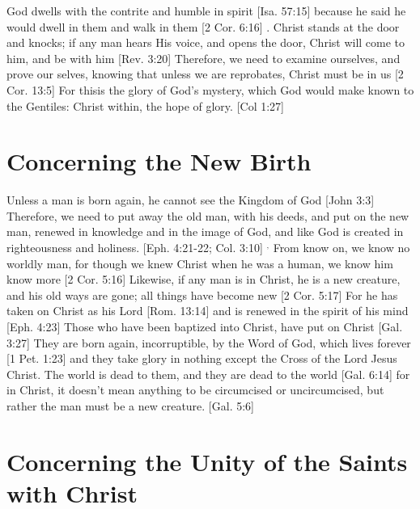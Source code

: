 \documentclass[../main.tex] {subfiles}
\begin{document}
	God dwells with the contrite and humble in spirit [Isa. 57:15]  because he said he would dwell in them and walk in them [2 Cor. 6:16] . Christ stands at the door and knocks; if any man hears His voice, and opens the door, Christ will come to him, and be with him [Rev. 3:20]  Therefore, we need to examine ourselves, and prove our selves, knowing that unless we are reprobates, Christ must be in us [2 Cor. 13:5]  For thisis the glory of God's mystery, which God would make known to the Gentiles: Christ within, the hope of glory. [Col 1:27] 

	\section{Concerning the New Birth}

	Unless a man is born again, he cannot see the Kingdom of God [John 3:3]  Therefore, we need to put away the old man, with his deeds, and put on the new man, renewed in knowledge and in the image of God, and like God is created in righteousness and holiness. [Eph. 4:21-22; Col. 3:10] $^{,}$ From know on, we know no worldly man, for though we knew Christ when he was a human, we know him know more [2 Cor. 5:16]  Likewise, if any man is in Christ, he is a new creature, and his old ways are gone; all things have become new [2 Cor. 5:17]  For he has taken on Christ as his Lord [Rom. 13:14]  and is renewed in the spirit of his mind [Eph. 4:23]  Those who have been baptized into Christ, have put on Christ [Gal. 3:27]  They are born again, incorruptible, by the Word of God, which lives forever [1 Pet. 1:23]  and they take glory in nothing except the Cross of the Lord Jesus Christ. The world is dead to them, and they are dead to the world [Gal. 6:14]  for in Christ, it doesn't mean anything to be circumcised or uncircumcised, but rather the man must be a new creature. [Gal. 5:6] 

	\section{Concerning the Unity of the Saints with Christ}
\end{document}
